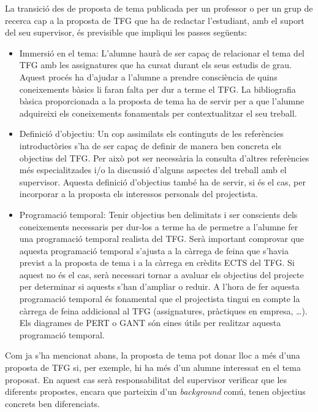 La transició des de proposta de tema publicada per un professor o per un grup de recerca cap a la proposta de \ac{TFG} que ha de redactar l'estudiant, amb el suport del seu supervisor, és previsible que impliqui les passes següents:
\begin{itemize}
\item Immersió en el tema: L'alumne haurà de ser capaç de relacionar el tema del \ac{TFG} amb les assignatures que ha cursat durant els seus estudis de grau. Aquest procés ha d'ajudar a l'alumne a prendre consciència de quins coneixements bàsics li faran falta per dur a terme el \ac{TFG}. La bibliografia bàsica proporcionada a la proposta de tema ha de servir per a que l'alumne adquireixi els coneixements fonamentals per contextualitzar el seu treball.
\item Definició d'objectiu: Un cop assimilats els continguts de les referències introductòries s'ha de ser capaç de definir de manera ben concreta els objectius del \ac{TFG}. Per això pot ser necessària la consulta d'altres referències més especialitzades i/o la discussió d'alguns aspectes del treball amb el supervisor. Aquesta definició d'objectius també ha de servir, si és el cas, per incorporar a la proposta els interessos personals del projectista.
\item Programació temporal: Tenir objectius ben delimitats i ser conscients dels coneixements necessaris per dur-los a terme ha de permetre a l'alumne fer una programació temporal realista del \ac{TFG}. Serà important comprovar que aquesta programació temporal s'ajusta a la càrrega de feina que s'havia previst a la proposta de tema i a la càrrega en crèdits ECTS del \ac{TFG}. Si aquest no és el cas, serà necessari tornar a avaluar els objectius del projecte per determinar si aquests s'han d'ampliar o reduir. A l'hora de fer aquesta programació temporal és fonamental que el projectista tingui en compte la càrrega de feina addicional al \ac{TFG} (assignatures, pràctiques en empresa, \ldots). Els diagrames de PERT o GANT són eines útils per realitzar aquesta programació temporal.
\end{itemize}
Com ja s'ha mencionat abans, la proposta de tema pot donar lloc a més d'una proposta de \ac{TFG} si, per exemple, hi ha més d'un alumne interessat en el tema proposat. En aquest cas serà
responsabilitat del supervisor verificar que les diferents propostes, encara que parteixin d'un \emph{background} comú, tenen objectius concrets ben diferenciats.

